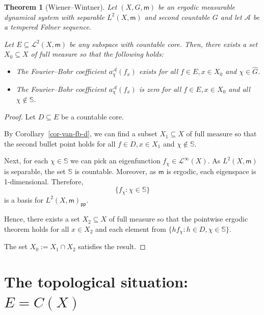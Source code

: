 \documentclass [14pt]{amsart}
\numberwithin{equation}{section}
\newcommand{\cL}{{\mathcal L}}
\newcommand{\cA}{{\mathcal A}}
\newcommand{\mm}{\mathsf{m}}
\newcommand{\SSS}{\mathbb S}
\newtheorem{theorem}{Theorem}[section]
\newtheorem{remark}[theorem]{Remark}
\begin{document}
\begin{theorem}[Wiener--Wintner] \label{thm-ww} Let $(X,G,\mm)$ be an ergodic  measurable  dynamical system with separable $L^2 (X,\mm)$ and second countable $G$ and let $\cA$ be a tempered  F\o lner sequence.

Let $E \subseteq \mathcal{L}^2 (X,\mm)$  be any subspace with countable core. Then, there exists a set $X_0 \subseteq X$ of full measure so that the following holds:
\begin{itemize}
  \item The Fourier--Bohr coefficient $a_{\chi}^\cA(f_x)$ exists for all $f \in E, x \in X_0$ and $\chi \in \widehat{G}$.
  \item  The Fourier--Bohr coefficient $a_{\chi}^\cA(f_x)$ is zero for all $f \in E, x \in X_0$ and all $\chi \notin \SSS$.
\end{itemize}
\end{theorem}
\begin{proof}
Let $D \subseteq E$ be a countable core.

By Corollary~\ref{cor-van-fb-d},  we can find a subset $X_1 \subseteq X$ of full measure so that the second bullet point holds for all $f \in D, x \in X_1$ and $\chi \notin \SSS$.

Next, for each $\chi \in \SSS$ we can pick an eigenfunction $f_\chi \in \cL^\infty(X)$. As $L^2(X, \mm)$ is separable, the set $\SSS$ is countable. Moreover, as $\mm$ is ergodic, each eigenspace is 1-dimensional. Therefore,
\[
\{ f_\chi : \chi \in \SSS \}
\]
is a basis for $L^2(X, \mm)_{\mathsf{pp}}$.

Hence, there exists a set $X_2 \subseteq X$ of full measure so that the pointwise  ergodic theorem holds for all $x \in X_2$ and each element from  $\{ h f_\chi : h \in D, \chi \in \SSS \}$.

The set $X_0:=X_1 \cap X_2$ satisfies the result.
\end{proof}



\section{The topological situation: $E = C(X)$}\label{sect:top}
\end{document}
